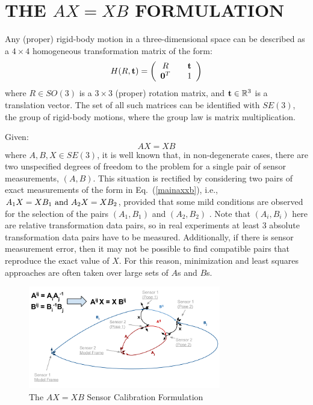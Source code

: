 \documentclass[twocolumn,10pt]{asme2ej}
\newcommand{\ttt}{{\bf t}}
\begin{document}
\section{THE $AX=XB$ FORMULATION}
\label{Formulation}
\noindent Any (proper) rigid-body motion in a three-dimensional space can be described as a $4 \times 4$ homogeneous transformation matrix of the form: 
\begin{equation} 
H(R, \ttt) = \left(
\begin{array}{ccc}
R && {\bf t} \\
{\bf 0}^T && 1 
\end{array} 
\right)
\label{homotrans} 
\end{equation}
where $R \in SO(3)$ is a $3\times 3$ (proper) rotation matrix, and ${\bf t} \in \mathbb{R}^3$ is a translation vector. The set of all such matrices can be identified with $SE(3)$, the group of rigid-body motions, where the group law is matrix multiplication.


Given:
\begin{equation}
A X = X B
\label{mainaxxb}
\end{equation}
where $A,  B, X \in SE(3)$, it is well known that, in non-degenerate cases, there are two unspecified degrees of freedom to the problem for a single pair of sensor measurements, $(A,B)$. This situation is rectified by considering two pairs of exact measurements of the form in Eq.~(\ref{mainaxxb}), i.e., $ {A_1}X=X{B_1} {\rm \,\, and \,\,} {A_2}X = X{B_2} $, provided that some mild conditions are observed for the selection of the pairs $(A_1,B_1)$ and $(A_2,B_2)$ \cite{chen91,park1994robot,shiu1989calibration}. Note that $(A_i, B_i)$ here are relative transformation data pairs, so in real experiments at least 3 absolute transformation data pairs have to 
be measured. Additionally, if there is sensor measurement error, then it may not be possible to find compatible pairs that reproduce the exact value of $X$. For this reason, minimization and least squares approaches are often taken over large sets of $A$s and $B$s.

\begin{figure}[t!]
\includegraphics[width=3.3in]{figure/AX=XB(ASME)_v1.png}
\centering
\caption{The $AX=XB$  Sensor Calibration Formulation}
\label{AXXBfig1}
\end{figure}
\end{document}
